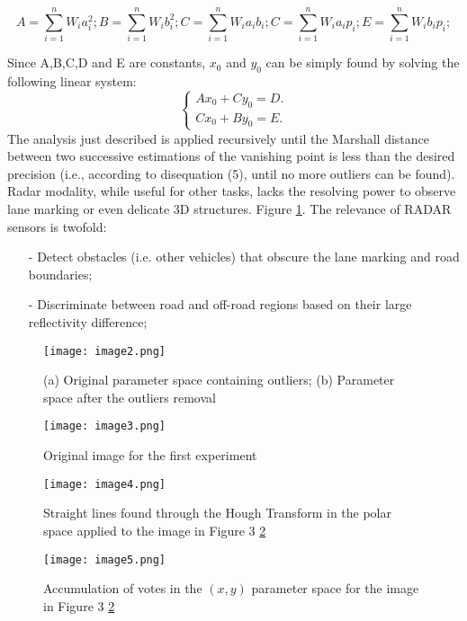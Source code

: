 \documentclass[12pt]{article}
\begin{document}
\begin{equation}\label{sum1}
A= \sum^n_{i=1} W_i a_i^2; B=\sum^n_{i=1} W_i b_i^2;C=\sum^n_{i=1} W_i a_i b_i ;C=\sum^n_{i=1} W_i a_i p_i ;E=\sum^n_{i=1} W_i b_ip_i;
\end{equation}
\raggedright Since A,B,C,D and E are constants, $x_0$ and $y_0$ can be simply found by solving the following linear system:
$$\begin{cases}
Ax_0+Cy_0=D.\\
Cx_0+By_0=E.
\end{cases}$$
The analysis just described is applied recursively until the Marshall distance between two successive estimations of the vanishing point is less than the desired precision (i.e., according to disequation (5\label{sum1}), until no more outliers can be found). Radar modality, while useful for other tasks, lacks the resolving power to observe lane marking or even delicate 3D structures. Figure \ref{label2}. The relevance of RADAR sensors is twofold:
\begin{itemize}
    \item[-] Detect obstacles (i.e. other vehicles) that obscure the lane marking and road boundaries;
    \item[-] Discriminate between road and off-road regions based on their large reflectivity difference;
\end{itemize}

\begin{figure}
    \centering
    \texttt{[image: image2.png]}
    \caption{(a) Original parameter space containing outliers; (b) Parameter space after the outliers removal}
    \label{label2}

\end{figure}
\begin{figure}
    \centering
    \texttt{[image: image3.png]}
    \caption{Original image for the first experiment}
    \label{label3}
\end{figure}
\begin{figure}
    \centering
    \texttt{[image: image4.png]}
    \caption{Straight lines found through the Hough Transform in the polar space applied to the image in Figure 3 \ref{label3}}
    \label{label4}
\end{figure}
\begin{figure}
    \centering
    \texttt{[image: image5.png]}
    \caption{Accumulation of votes in the $(x, y)$ parameter space for the image in Figure 3 \ref{label3}}
    \label{label5}
\end{figure}
\end{document}
